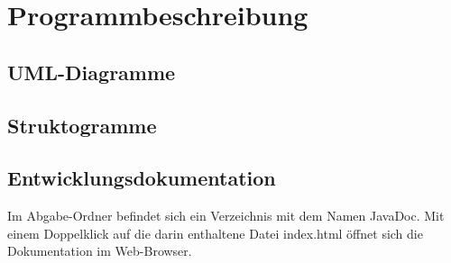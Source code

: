 \chapter{Programmbeschreibung}\label{ch:programmbeschreibung}

\section{UML-Diagramme}\label{sec:uml}


\section{Struktogramme}\label{sec:strukto}


\section{Entwicklungsdokumentation}\label{sec:entwicklerdokumentation}
Im Abgabe-Ordner befindet sich ein Verzeichnis mit dem Namen \glqq JavaDoc\grqq{}.
Mit einem Doppelklick auf die darin enthaltene Datei \glqq index.html\grqq{} öffnet sich die Dokumentation im Web-Browser.
